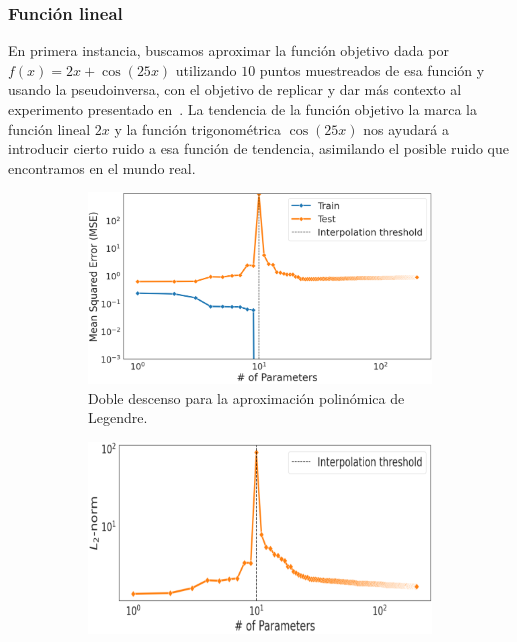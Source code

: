 \subsubsection{Función lineal}\label{subsubsec:funcion-lineal}

En primera instancia, buscamos aproximar la función objetivo dada por $f(x) = 2x + \cos(25x)$ utilizando $10$ puntos muestreados de esa función y usando la pseudoinversa, con el objetivo de replicar y dar más contexto al experimento presentado en~\cite{Schaeffer2023}. La tendencia de la función objetivo la marca la función lineal $2x$ y la función trigonométrica $\cos(25x)$ nos ayudará a introducir cierto ruido a esa función de tendencia, asimilando el posible ruido que encontramos en el mundo real.

\begin{figure}[h]
    \centering
    \begin{subfigure}[b]{0.48\textwidth}
        \centering
        \includegraphics[width=\textwidth]{img/experiments/legendre1DDD.png}
        \caption{Doble descenso para la aproximación polinómica de Legendre.}\label{fig:legendre1.1DDD}
    \end{subfigure}
    \hfill
    \begin{subfigure}[b]{0.48\textwidth}
        \centering
        \includegraphics[width=\textwidth]{img/experiments/legendre1.4.png}

\end{subfigure}
\end{figure}
